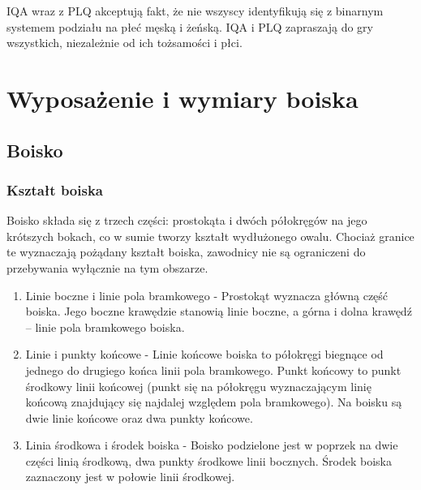\documentclass[12pt]{article}
\begin{document}
IQA wraz z PLQ akceptują fakt, że nie wszyscy identyfikują się z
binarnym systemem podziału na płeć męską i żeńską. IQA i PLQ zapraszają
do gry wszystkich, niezależnie od ich tożsamości i płci.

\pagebreak
\section{Wyposażenie i wymiary boiska}

\subsection{Boisko}

\subsubsection{Kształt boiska}
Boisko składa się z trzech części: prostokąta i dwóch półokręgów na jego
krótszych bokach, co w sumie tworzy kształt wydłużonego owalu. Chociaż
granice te wyznaczają pożądany kształt boiska, zawodnicy nie są
ograniczeni do przebywania wyłącznie na tym obszarze.
\begin{enumerate}
\item{Linie boczne i linie pola bramkowego} - Prostokąt wyznacza
główną część boiska. Jego boczne krawędzie stanowią linie boczne, a
górna i dolna krawędź -- linie pola bramkowego boiska.

\item{Linie i punkty końcowe} - Linie końcowe boiska to
półokręgi biegnące od jednego do drugiego końca linii pola bramkowego.
Punkt końcowy to punkt środkowy linii końcowej (punkt się na półokręgu
wyznaczającym linię końcową znajdujący się najdalej względem pola
bramkowego). Na boisku są dwie linie końcowe oraz dwa punkty końcowe.

\item{Linia środkowa i środek boiska} - Boisko podzielone
jest w poprzek na dwie części linią środkową, dwa punkty środkowe linii
bocznych. Środek boiska zaznaczony jest w połowie linii środkowej.
\end{enumerate}
\end{document}

